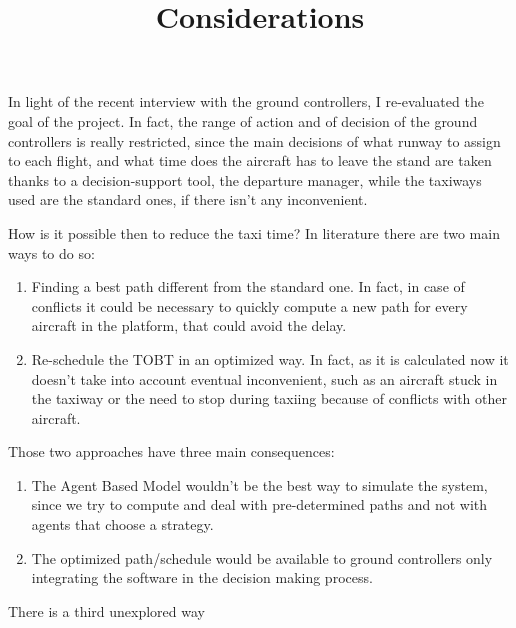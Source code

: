 \documentclass{article}
\begin{document}
		\title{Considerations}
	\maketitle
	
In light of the recent interview with the ground controllers, I re-evaluated the goal of the project. In fact, the range of action and of decision of the ground controllers is really restricted, since the main decisions of what runway to assign to each flight, and what time does the aircraft has to leave the stand are taken thanks to a decision-support tool, the departure manager, while the taxiways used are the standard ones, if there isn't any inconvenient.

How is it possible then to reduce the taxi time?
In literature there are two main ways to do so: 
\begin{enumerate}
	\item Finding a best path different from the standard one. In fact, in case of conflicts it could be necessary to quickly compute a new path for every aircraft in the platform, that could avoid the delay.
	\item Re-schedule the TOBT in an optimized way. In fact, as it is calculated now it doesn't take into account eventual inconvenient, such as an aircraft stuck in the taxiway or the need to stop during taxiing because of conflicts with other aircraft.
\end{enumerate}

Those two approaches have three main consequences:

\begin{enumerate}
	\item The Agent Based Model wouldn't be the best way to simulate the system, since we try to compute and deal with pre-determined paths and not with agents that choose a strategy.
	\item The optimized path/schedule would be available to ground controllers only integrating the software in the decision making process.
\end{enumerate}

There is a third unexplored way 
\end{document}
